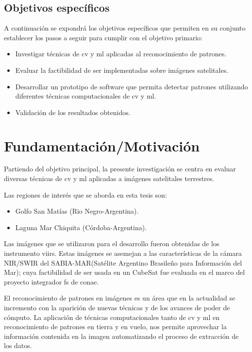 \subsection{Objetivos específicos }\label{sub:obj_especifico}
A continuación se expondrá los objetivos específicos que permiten en su conjunto establecer los pasos a seguir para  cumplir con el objetivo primario:
\begin{itemize}
 \item Investigar técnicas de \ac{cv} y \ac{ml} aplicadas al reconocimiento de patrones.
 \item Evaluar la factibilidad de ser implementadas sobre imágenes satelitales.
 \item Desarrollar un prototipo de software que permita detectar patrones utilizando diferentes técnicas computacionales de \ac{cv} y \ac{ml}.
 \item Validación de los resultados obtenidos.
\end{itemize}


\section{Fundamentación/Motivación}\label{sec:fundamentacion}

Partiendo del objetivo principal, la presente investigación se centra en evaluar diversas técnicas de \ac{cv} y \ac{ml} aplicadas a imágenes satelitales terrestres.

Las regiones de interés que se aborda en esta tesis son:
\begin{itemize}
	\item Golfo San Matías (Rio Negro-Argentina).
	\item Laguna Mar Chiquita (Córdoba-Argentina).
\end{itemize}

Las imágenes que se utilizaron para el desarrollo fueron obtenidas de los instrumento  \ac{viirs}. Estas imágenes se asemejan a las características de la cámara NIR/SWIR del SABIA-MAR(Satélite Argentino Brasileño para Información del Mar); cuya factibilidad de ser usada en un CubeSat fue evaluada en el marco del proyecto integrador \ac{fs} de \ac{conae}.

El reconocimiento de patrones en imágenes es un área que en la actualidad se incremento con la aparición de nuevas técnicas y de los avances de poder de cómputo. La aplicación de técnicas computacionales tanto de  \ac{cv} y \ac{ml} en reconocimiento de patrones  en tierra y en vuelo, nos permite aprovechar la información contenida en la imagen  automatizando el proceso de extracción de los datos.

